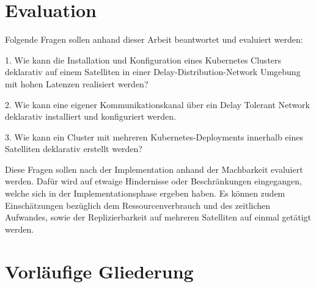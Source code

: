 \documentclass[
  ngerman,
  symmetric,
  cdfont=on,
  numbers=noenddot,
  parskip
]{tudscrreprt}
\begin{document}
\section{Evaluation}
Folgende Fragen sollen anhand dieser Arbeit beantwortet und evaluiert werden: 

1. Wie kann die Installation und Konfiguration eines Kubernetes Clusters deklarativ auf einem Satelliten in einer Delay-Distribution-Network Umgebung mit hohen Latenzen realisiert werden?

2. Wie kann eine eigener Kommunikationskanal über ein Delay Tolerant Network deklarativ installiert und konfiguriert werden. 

3. Wie kann ein Cluster mit mehreren Kubernetes-Deployments innerhalb eines Satelliten deklarativ erstellt werden? 

Diese Fragen sollen nach der Implementation anhand der Machbarkeit evaluiert werden. Dafür wird auf etwaige Hindernisse oder Beschränkungen eingegangen, welche sich in der Implementationsphase ergeben haben. Es können zudem Einschätzungen bezüglich dem Ressourcenverbrauch und des zeitlichen Aufwandes, sowie der Replizierbarkeit auf mehreren Satelliten auf einmal getätigt werden. 

\section{Vorläufige Gliederung}
\end{document}
